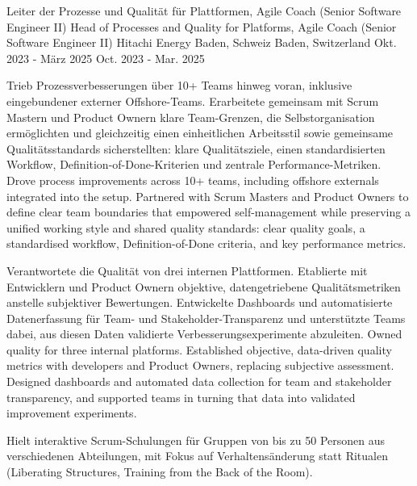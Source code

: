 \begin{cventries}
	\cventry
	{
			{ Leiter der Prozesse und Qualität für Plattformen, Agile Coach (Senior Software Engineer II) }
			{ Head of Processes and Quality for Platforms, Agile Coach (Senior Software Engineer II) }
	} %
	{Hitachi Energy} %
	{
		{ Baden, Schweiz }
		{ Baden, Switzerland }
	} %
	{
			{Okt. 2023 - März 2025}
			{Oct. 2023 - Mar. 2025}
	} %
	{
		\begin{cvitems}
			\item {
				{
					Trieb Prozessverbesserungen über 10+ Teams hinweg voran, inklusive eingebundener externer Offshore-Teams. Erarbeitete gemeinsam mit Scrum Mastern und Product Ownern klare Team-Grenzen, die Selbstorganisation ermöglichten und gleichzeitig einen einheitlichen Arbeitsstil sowie gemeinsame Qualitätsstandards sicherstellten: klare Qualitätsziele, einen standardisierten Workflow, Definition-of-Done-Kriterien und zentrale Performance-Metriken.
				}
				{
					Drove process improvements across 10+ teams, including offshore externals integrated into the setup. Partnered with Scrum Masters and Product Owners to define clear team boundaries that empowered self-management while preserving a unified working style and shared quality standards: clear quality goals, a standardised workflow, Definition-of-Done criteria, and key performance metrics.
				}
			}			
			\item {
				{
					Verantwortete die Qualität von drei internen Plattformen. Etablierte mit Entwicklern und Product Ownern objektive, datengetriebene Qualitätsmetriken anstelle subjektiver Bewertungen. Entwickelte Dashboards und automatisierte Datenerfassung für Team- und Stakeholder-Transparenz und unterstützte Teams dabei, aus diesen Daten validierte Verbesserungsexperimente abzuleiten.
				}
				{
					Owned quality for three internal platforms. Established objective, data-driven quality metrics with developers and Product Owners, replacing subjective assessment. Designed dashboards and automated data collection for team and stakeholder transparency, and supported teams in turning that data into validated improvement experiments.
				}
			}	
			\item {
				{
					Hielt interaktive Scrum-Schulungen für Gruppen von bis zu 50 Personen aus verschiedenen Abteilungen, mit Fokus auf Verhaltensänderung statt Ritualen (Liberating Structures, Training from the Back of the Room).
}}
\end{cvitems}}
\end{cventries}
